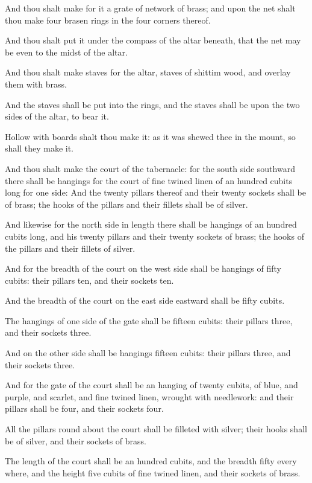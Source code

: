 \verse And thou shalt make for it a grate of network of brass; and upon
the net shalt thou make four brasen rings in the four corners thereof.

\verse And thou shalt put it under the compass of the altar beneath,
that the net may be even to the midst of the altar.

\verse And thou shalt make staves for the altar, staves of shittim wood,
and overlay them with brass.

\verse And the staves shall be put into the rings, and the staves shall
be upon the two sides of the altar, to bear it.

\verse Hollow with boards shalt thou make it: as it was shewed thee in
the mount, so shall they make it.

\verse And thou shalt make the court of the tabernacle: for the south
side southward there shall be hangings for the court of fine twined
linen of an hundred cubits long for one side: \verse And the twenty
pillars thereof and their twenty sockets shall be of brass; the hooks
of the pillars and their fillets shall be of silver.

\verse And likewise for the north side in length there shall be
hangings of an hundred cubits long, and his twenty pillars and their
twenty sockets of brass; the hooks of the pillars and their fillets of
silver.

\verse And for the breadth of the court on the west side shall be
hangings of fifty cubits: their pillars ten, and their sockets ten.

\verse And the breadth of the court on the east side eastward shall be
fifty cubits.

\verse The hangings of one side of the gate shall be fifteen cubits:
their pillars three, and their sockets three.

\verse And on the other side shall be hangings fifteen cubits: their
pillars three, and their sockets three.

\verse And for the gate of the court shall be an hanging of twenty
cubits, of blue, and purple, and scarlet, and fine twined linen,
wrought with needlework: and their pillars shall be four, and their
sockets four.

\verse All the pillars round about the court shall be filleted with
silver; their hooks shall be of silver, and their sockets of brass.

\verse The length of the court shall be an hundred cubits, and the
breadth fifty every where, and the height five cubits of fine twined
linen, and their sockets of brass.

